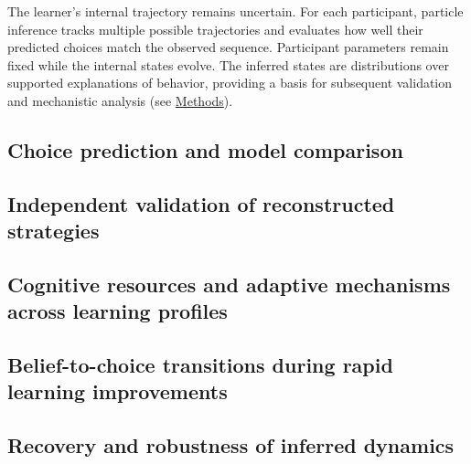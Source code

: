 The learner's internal trajectory remains uncertain. For each participant,
particle inference tracks multiple possible trajectories and evaluates how
well their predicted choices match the observed sequence. Participant
parameters remain fixed while the internal states evolve. The inferred
states are distributions over supported explanations of behavior, providing
a basis for subsequent validation and mechanistic analysis
(see \hyperref[m:inference]{Methods}).

\subsection*{Choice prediction and model comparison}
\label{r:prediction}

\subsection*{Independent validation of reconstructed strategies}
\label{r:validation}

\subsection*{Cognitive resources and adaptive mechanisms across learning profiles}
\label{r:trajectories}\label{r:feedback}

\subsection*{Belief-to-choice transitions during rapid learning improvements}
\label{r:transitions}

\subsection*{Recovery and robustness of inferred dynamics}
\label{r:recovery}
